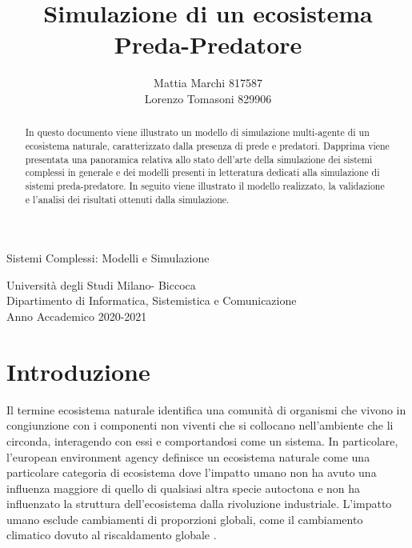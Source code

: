 \documentclass[11pt]{article}
\begin{document}
\title{Simulazione di un ecosistema Preda-Predatore}

\author{Mattia Marchi 817587 \\
Lorenzo Tomasoni 829906 }

\maketitle

\vspace{5cm}

\begin{center}
\Large{Sistemi Complessi: Modelli e Simulazione}

\vspace{4cm}

\large{Università degli Studi Milano- Biccoca \\
Dipartimento di Informatica, Sistemistica e Comunicazione \\
Anno Accademico 2020-2021}
\end{center}

\newpage

\begin{abstract}
    In questo documento viene illustrato un modello di simulazione multi-agente di un ecosistema naturale, caratterizzato dalla presenza di prede e predatori. Dapprima viene presentata una panoramica relativa allo stato dell'arte della simulazione dei sistemi complessi in generale e dei modelli presenti in letteratura dedicati alla simulazione di sistemi preda-predatore. In seguito viene illustrato il modello realizzato, la validazione e l'analisi dei risultati ottenuti dalla simulazione. 
\end{abstract}

\newpage

\tableofcontents


\newpage

\section{Introduzione}
Il termine ecosistema naturale identifica una comunità di organismi che vivono in congiunzione con i componenti non viventi che si collocano nell'ambiente che li circonda, interagendo con essi e comportandosi come un sistema. In particolare, l'european environment agency definisce un ecosistema naturale come una particolare categoria di ecosistema dove l'impatto umano non ha avuto una influenza maggiore di quello di qualsiasi altra specie autoctona e non ha influenzato la struttura dell'ecosistema dalla rivoluzione industriale. L'impatto umano esclude cambiamenti di proporzioni globali, come il cambiamento climatico dovuto al riscaldamento globale \cite{EEA}.
\end{document}
